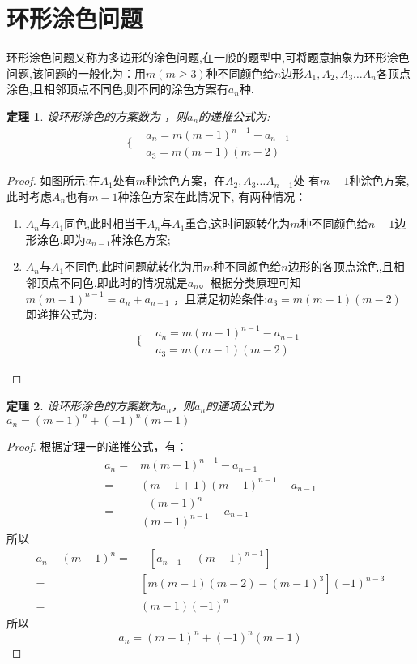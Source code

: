 \section{环形涂色问题}
环形涂色问题又称为多边形的涂色问题,在一般的题型中,可将题意抽象为环形涂色问题,该问题的一般化为：用$m(m\ge 3)$种不同颜色给$n$边形$A_1,A_2,A_3\dots A_n$各顶点涂色,且相邻顶点不同色,则不同的涂色方案有$a_n$种.
\newtheorem{theorem}{定理}[section]
\begin{theorem}
设环形涂色的方案数为 ，则$a_n$的递推公式为:$$\Bigg\{\begin{aligned} &a_n=m(m-1)^{n-1}-a_{n-1}\\&a_3=m(m-1)(m-2)\end{aligned}$$
\end{theorem}
\begin{proof}
如图所示:在$A_1$处有$m$种涂色方案，在$A_2,A_3\dots A_{n-1}$处
有$m-1$种涂色方案,此时考虑$A_n$也有$m-1$种涂色方案在此情况下,
有两种情况：
\begin{enumerate}[1)]
\item$A_n$与$A_1$同色,此时相当于$A_n$与$A_1$重合,这时问题转化为$m$种不同颜色给$n-1$边形涂色,即为$a_{n-1}$种涂色方案;
\item $A_n$与$A_1$不同色,此时问题就转化为用$m$种不同颜色给$n$边形的各顶点涂色,且相邻顶点不同色,即此时的情况就是$a_n$。根据分类原理可知$m(m-1)^{n-1}=a_n+a_{n-1}$ ，且满足初始条件:$a_3=m(m-1)(m-2)$
即递推公式为:$$\Bigg\{\begin{aligned} &a_n=m(m-1)^{n-1}-a_{n-1}\\&a_3=m(m-1)(m-2)\end{aligned}$$
\end{enumerate} 
\end{proof}
\begin{theorem}
设环形涂色的方案数为$a_n$，则$a_n$的通项公式为 $a_n=(m-1)^{n}+(-1)^n(m-1)$
\end{theorem}
\begin{proof}
根据定理一的递推公式，有：
$$\begin{aligned}a_n=&m(m-1)^{n-1}-a_{n-1}\\=&(m-1+1)(m-1)^{n-1}-a_{n-1}\\=&\dfrac{(m-1)^{n}}{(m-1)^{n-1}}-a_{n-1}\end{aligned}$$
所以$$\begin{aligned}a_n-(m-1)^n=&-[a_{n-1}-(m-1)^{n-1}]\\=&[m(m-1)(m-2)-(m-1)^3](-1)^{n-3}\\=&(m-1)(-1)^n\end{aligned}$$
所以$$a_n=(m-1)^n+(-1)^n(m-1)$$
\end{proof}